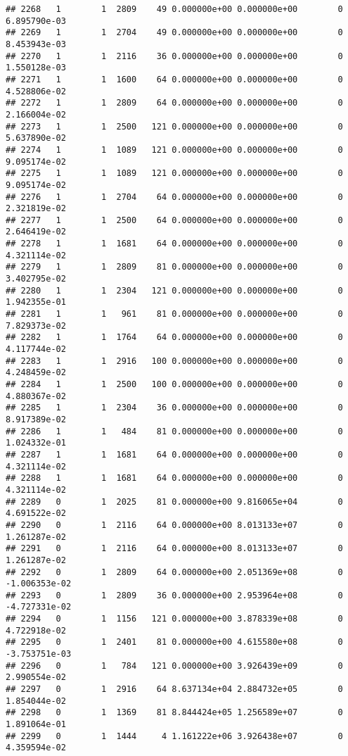 \documentclass[
]{article}
\begin{document}
\begin{enumerate}
\begin{verbatim}
## 2268   1        1  2809    49 0.000000e+00 0.000000e+00        0  6.895790e-03
## 2269   1        1  2704    49 0.000000e+00 0.000000e+00        0  8.453943e-03
## 2270   1        1  2116    36 0.000000e+00 0.000000e+00        0  1.550128e-03
## 2271   1        1  1600    64 0.000000e+00 0.000000e+00        0  4.528806e-02
## 2272   1        1  2809    64 0.000000e+00 0.000000e+00        0  2.166004e-02
## 2273   1        1  2500   121 0.000000e+00 0.000000e+00        0  5.637890e-02
## 2274   1        1  1089   121 0.000000e+00 0.000000e+00        0  9.095174e-02
## 2275   1        1  1089   121 0.000000e+00 0.000000e+00        0  9.095174e-02
## 2276   1        1  2704    64 0.000000e+00 0.000000e+00        0  2.321819e-02
## 2277   1        1  2500    64 0.000000e+00 0.000000e+00        0  2.646419e-02
## 2278   1        1  1681    64 0.000000e+00 0.000000e+00        0  4.321114e-02
## 2279   1        1  2809    81 0.000000e+00 0.000000e+00        0  3.402795e-02
## 2280   1        1  2304   121 0.000000e+00 0.000000e+00        0  1.942355e-01
## 2281   1        1   961    81 0.000000e+00 0.000000e+00        0  7.829373e-02
## 2282   1        1  1764    64 0.000000e+00 0.000000e+00        0  4.117744e-02
## 2283   1        1  2916   100 0.000000e+00 0.000000e+00        0  4.248459e-02
## 2284   1        1  2500   100 0.000000e+00 0.000000e+00        0  4.880367e-02
## 2285   1        1  2304    36 0.000000e+00 0.000000e+00        0  8.917389e-02
## 2286   1        1   484    81 0.000000e+00 0.000000e+00        0  1.024332e-01
## 2287   1        1  1681    64 0.000000e+00 0.000000e+00        0  4.321114e-02
## 2288   1        1  1681    64 0.000000e+00 0.000000e+00        0  4.321114e-02
## 2289   0        1  2025    81 0.000000e+00 9.816065e+04        0  4.691522e-02
## 2290   0        1  2116    64 0.000000e+00 8.013133e+07        0  1.261287e-02
## 2291   0        1  2116    64 0.000000e+00 8.013133e+07        0  1.261287e-02
## 2292   0        1  2809    64 0.000000e+00 2.051369e+08        0 -1.006353e-02
## 2293   0        1  2809    36 0.000000e+00 2.953964e+08        0 -4.727331e-02
## 2294   0        1  1156   121 0.000000e+00 3.878339e+08        0  4.722918e-02
## 2295   0        1  2401    81 0.000000e+00 4.615580e+08        0 -3.753751e-03
## 2296   0        1   784   121 0.000000e+00 3.926439e+09        0  2.990554e-02
## 2297   0        1  2916    64 8.637134e+04 2.884732e+05        0  1.854044e-02
## 2298   0        1  1369    81 8.844424e+05 1.256589e+07        0  1.891064e-01
## 2299   0        1  1444     4 1.161222e+06 3.926438e+07        0  4.359594e-02

\end{verbatim}
\end{enumerate}
\end{document}
